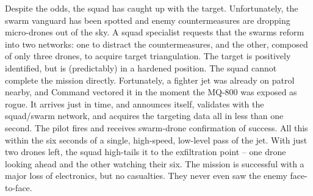 %
%
%

Despite the odds, the squad has caught up with the target.
Unfortunately, the swarm vanguard has been spotted and enemy countermeasures are dropping micro-drones out of the sky.
A squad specialist requests that the swarms reform into two networks: one to distract the countermeasures, and the other, composed of only three drones, to acquire target triangulation.
The target is positively identified, but is (predictably) in a hardened position.
The squad cannot complete the mission directly.
Fortunately, a fighter jet was already on patrol nearby, and Command vectored it in the moment the MQ-800 was exposed as rogue.
It arrives just in time, and announces itself, validates with the squad/swarm network, and acquires the targeting data all in less than one second.
The pilot fires and receives swarm-drone confirmation of success.
All this within the six seconds of a single, high-speed, low-level pass of the jet.
With just two drones left, the squad high-tails it to the exfiltration point -- one drone looking ahead and the other watching their six.
The mission is successful with a major loss of electronics, but no casualties.
They never even saw the enemy face-to-face.

